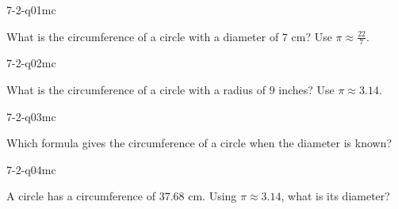 

\begin{practiceQuestion}{7-2-q01}{mc}
\begin{questionText}
What is the circumference of a circle with a diameter of $7$ cm? Use $\pi \approx \frac{22}{7}$.
\end{questionText}
\end{practiceQuestion}

\begin{practiceQuestion}{7-2-q02}{mc}
\begin{questionText}
What is the circumference of a circle with a radius of $9$ inches? Use $\pi \approx 3.14$.
\end{questionText}
\end{practiceQuestion}

\begin{practiceQuestion}{7-2-q03}{mc}
\begin{questionText}
Which formula gives the circumference of a circle when the diameter is known?
\end{questionText}
\end{practiceQuestion}

\begin{practiceQuestion}{7-2-q04}{mc}
\begin{questionText}
A circle has a circumference of $37.68$ cm. Using $\pi \approx 3.14$, what is its diameter?
\end{questionText}
\end{practiceQuestion}

